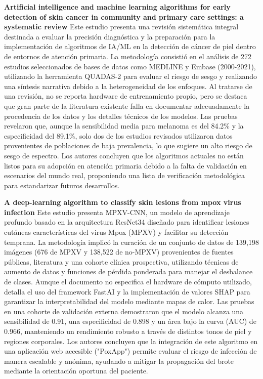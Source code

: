 \documentclass[11pt, a4paper]{article}
\begin{document}
\textbf{Artificial intelligence and machine learning algorithms for early detection of skin cancer in community and primary care settings: a systematic review} \cite{jones_artificial_2022}
Este estudio presenta una revisión sistemática integral destinada a evaluar la precisión diagnóstica y la preparación para la implementación de algoritmos de IA/ML en la detección de cáncer de piel dentro de entornos de atención primaria.
La metodología consistió en el análisis de 272 estudios seleccionados de bases de datos como MEDLINE y Embase (2000-2021), utilizando la herramienta QUADAS-2 para evaluar el riesgo de sesgo y realizando una síntesis narrativa debido a la
heterogeneidad de los enfoques. Al tratarse de una revisión, no se reporta hardware de entrenamiento propio, pero se destaca que gran parte de la literatura existente falla en documentar adecuadamente la procedencia de los datos y los 
detalles técnicos de los modelos. Las pruebas revelaron que, aunque la sensibilidad media para melanoma es del 84.2\% y la especificidad del 89.1\%, solo dos de los estudios revisados utilizaron datos provenientes de poblaciones de baja
prevalencia, lo que sugiere un alto riesgo de sesgo de espectro. Los autores concluyen que los algoritmos actuales no están listos para su adopción en atención primaria debido a la falta de validación en escenarios del mundo real,
proponiendo una lista de verificación metodológica para estandarizar futuros desarrollos.

\textbf{A deep-learning algorithm to classify skin lesions from mpox virus infection} \cite{thieme_deep-learning_2023}
Este estudio presenta MPXV-CNN, un modelo de aprendizaje profundo basado en la arquitectura ResNet34 diseñado para identificar lesiones cutáneas características del virus Mpox (MPXV) y facilitar su detección temprana. La metodología implicó
la curación de un conjunto de datos de 139,198 imágenes (676 de MPXV y 138,522 de no-MPXV) provenientes de fuentes públicas, literatura y una cohorte clínica prospectiva, utilizando técnicas de aumento de datos y funciones de pérdida 
ponderada para manejar el desbalance de clases. Aunque el documento no especifica el hardware de cómputo utilizado, detalla el uso del framework FastAI y la implementación de valores SHAP para garantizar la interpretabilidad del modelo 
mediante mapas de calor. Las pruebas en una cohorte de validación externa demostraron que el modelo alcanza una sensibilidad de 0.91, una especificidad de 0.898 y un área bajo la curva (AUC) de 0.966, manteniendo un rendimiento robusto a
través de distintos tonos de piel y regiones corporales. Los autores concluyen que la integración de este algoritmo en una aplicación web accesible ("PoxApp") permite evaluar el riesgo de infección de manera escalable y anónima, ayudando a
mitigar la propagación del brote mediante la orientación oportuna del paciente.
\end{document}

